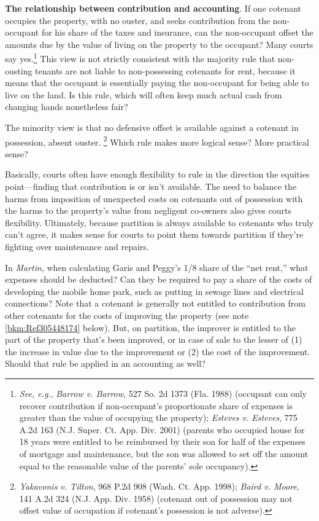 \item \textbf{The relationship between contribution and accounting}. If one
cotenant occupies the property, with no ouster, and seeks contribution from the
non-occupant for his share of the taxes and insurance, can the non-occupant
offset the amounts due by the value of living on the property to the occupant?
Many courts say yes.\footnote{ \emph{See, e.g.}, \emph{Barrow v. Barrow}, 527
So. 2d 1373 (Fla. 1988) (occupant can only recover contribution if
non-occupant's proportionate share of expenses is greater than the value of
occupying the property); \emph{Esteves v. Esteves}, 775 A.2d 163 (N.J. Super.
Ct. App. Div. 2001) (parents who occupied house for 18 years were entitled to be
reimbursed by their son for half of the expenses of mortgage and maintenance,
but the son was allowed to set off the amount equal to the reasonable value of
the parents' sole occupancy).} This view is not strictly consistent with the
majority rule that
non-ousting tenants are not liable to non-possessing cotenants for rent, because
it means that the occupant is essentially paying the non-occupant for being able
to live on the land. Is this rule, which will often keep much actual cash from
changing hands nonetheless fair?

The minority view is that no defensive offset is available against a cotenant in
possession, absent ouster. \footnote{\emph{Yakavonis v. Tilton}, 968 P.2d 908
(Wash. Ct. App. 1998); \emph{Baird v. Moore}, 141 A.2d 324 (N.J. App. Div. 1958)
(cotenant out of possession may not offset value of occupation if cotenant's
possession is not adverse).} Which rule makes more logical sense? More practical
sense?


Basically, courts often have enough flexibility to rule in the direction the
equities point---finding that contribution is or isn't available. The need to
balance the harms from imposition of unexpected costs on cotenants out of
possession with the harms to the property's value from negligent co-owners also
gives courts flexibility. Ultimately, because partition is always available to
cotenants who truly can't agree, it makes sense for courts to point them
towards partition if they're fighting over maintenance and repairs.


In \textit{Martin}, when calculating Garis and Peggy's 1/8
share of the ``net rent,'' what expenses should be deducted? Can they be
required to pay a share of the costs of developing the mobile home park, such
as putting in sewage lines and electrical connections? Note that a cotenant is
generally not entitled to contribution from other cotenants for the costs of
improving the property (see note \ref{bkm:Ref305448174} below). But, on
partition, the improver is entitled to the part of the property that's been
improved, or in case of sale to the lesser of (1) the increase in value due to
the improvement or (2) the cost of the improvement. Should that rule be
applied in an accounting as well?

